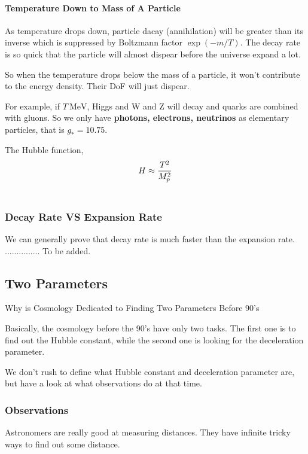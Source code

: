 \documentclass[letterpaper,10pt,english]{sphinxmanual}
\begin{document}
{\paragraph{Temperature Down to Mass of A Particle}
\label{Cosmology/cosmoIndex:temperature-down-to-mass-of-a-particle}
As temperature drops down, particle dacay (annihilation) will be greater than its inverse which is suppressed by Boltzmann factor $\exp (-m/T)$. The decay rate is so quick that the particle will almost dispear before the universe expand a lot.

So when the temperature drops below the mass of a particle, it won't contribute to the energy density. Their DoF will just dispear.

For example, if $T~\mathrm{MeV}$, Higgs and W and Z will decay and quarks are combined with gluons. So we only have \textbf{photons, electrons, neutrinos} as elementary particles, that is $g_* = 10.75$.

The Hubble function,
\begin{gather}
\begin{split}H \approx \frac{T^2}{M _ p ^2}\end{split}\notag\\\begin{split}\end{split}\notag
\end{gather}

\subsubsection{Decay Rate VS Expansion Rate}
\label{Cosmology/cosmoIndex:decay-rate-vs-expansion-rate}
We can generally prove that decay rate is much faster than the expansion rate. ............... To be added.


\subsection{Two Parameters}
\label{Cosmology/cosmoIndex:two-parameters}
Why is Cosmology Dedicated to Finding Two Parameters Before 90's

Basically, the cosmology before the 90's have only two tasks. The first one is to find out the Hubble constant, while the second one is looking for the deceleration parameter.

We don't rush to define what Hubble constant and deceleration parameter are, but have a look at what observations do at that time.


\subsubsection{Observations}
\label{Cosmology/cosmoIndex:observations}
Astronomers are really good at measuring distances. They have infinite tricky ways to find out some distance.


}
\end{document}
